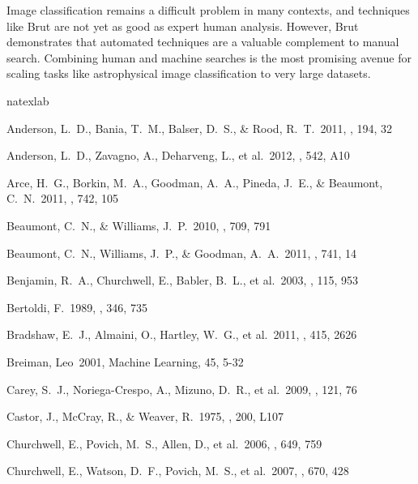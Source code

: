 Image classification remains a difficult problem in many contexts, and techniques like Brut are not yet as good as expert human analysis. However, Brut demonstrates that automated techniques are a valuable complement to manual search.  Combining human and machine searches is the most promising avenue for scaling tasks like astrophysical image classification to very large datasets.


\begin{thebibliography}{16}
\expandafter\ifx\csname natexlab\endcsname\relax\def\natexlab#1{#1}\fi

 Anderson, L.~D.,
Bania, T.~M., Balser, D.~S., \& Rood, R.~T.\ 2011, \apjs, 194, 32

 Anderson, L.~D., Zavagno, A., Deharveng, L., et al.\ 2012, \aap, 542, A10

 Arce, H.~G., Borkin,
M.~A., Goodman, A.~A., Pineda, J.~E.,
\& Beaumont, C.~N.\ 2011, \apj, 742, 105

 Beaumont, C.~N., \& Williams, J.~P.\ 2010, \apj, 709, 791

 Beaumont, C.~N.,
Williams, J.~P., \& Goodman, A.~A.\ 2011, \apj, 741, 14

 Benjamin, R.~A.,
Churchwell, E., Babler, B.~L., et al.\ 2003, \pasp, 115, 953

 Bertoldi, F.\ 1989, \apj,
346, 735

 Bradshaw, E.~J.,
Almaini, O., Hartley, W.~G., et al.\ 2011, \mnras, 415, 2626

 Breiman, Leo\ 2001, Machine Learning, 45, 5-32

 Carey, S.~J.,
Noriega-Crespo, A., Mizuno, D.~R., et al.\ 2009, \pasp, 121, 76

 Castor, J., McCray, R.,
\& Weaver, R.\ 1975, \apjl, 200, L107

 Churchwell, E.,
Povich, M.~S., Allen, D., et al.\ 2006, \apj, 649, 759

 Churchwell, E.,
Watson, D.~F., Povich, M.~S., et al.\ 2007, \apj, 670, 428


\end{thebibliography}
